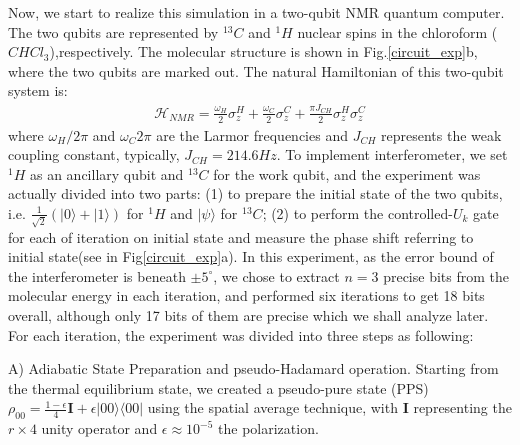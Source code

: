 \def\CTeXPreproc{Created by ctex v0.2.12, don't edit!}\documentclass[twocolumn,showpacs,twoside,10pt,superscriptaddress,prl]{revtex4}
\begin{document}
Now, we start to realize this simulation in a two-qubit NMR quantum
computer. The two qubits are represented by $^{13}C$ and $^{1}H$
nuclear spins in the chloroform ($CHCl_{3}$),respectively. The
molecular structure is shown in Fig.\ref{circuit_exp}b, where the
two qubits are marked out. The natural Hamiltonian of this two-qubit
system is:
\begin{eqnarray}\label{HamCHF}
\mathcal{H}_{\mathit{NMR}}=\frac{\omega_{H}}{2}\sigma_{z}^H+\frac{\omega_{C}}{2}\sigma_{z}^{C}+\frac{\pi
J_{CH}}{2}\sigma_{z}^{H}\sigma_{z}^{C}
\end{eqnarray}
where $\omega_{H}/2\pi$ and $\omega_{C}2\pi$ are the Larmor
frequencies and $J_{CH}$ represents the weak coupling constant,
typically, $J_{CH}=214.6Hz$. To implement interferometer, we set
$^{1}H$ as an ancillary qubit and $^{13}C$ for the work qubit, and
the experiment was actually divided into two parts: (1) to prepare
 the initial state of the two qubits, i.e.
$\frac{1}{\sqrt{2}}(|0\rangle+|1\rangle)$ for $^{1}H$ and
$|\psi\rangle$ for $^{13}C$; (2) to perform the controlled-$U_k$
gate for each of iteration on initial state and measure the phase
shift referring to initial state(see in Fig\ref{circuit_exp}a). In
this experiment, as the error bound of the interferometer is beneath
$\pm5^\circ$, we chose to extract $n=3$ precise bits from the
molecular energy in each iteration, and performed six iterations to
get 18 bits overall, although only 17 bits of them are precise which
we shall analyze later. For each iteration, the experiment was
divided into three steps as following:

A) Adiabatic State Preparation and pseudo-Hadamard operation.
  Starting from the thermal equilibrium state, we created a pseudo-pure state (PPS) $\rho_{00} =\frac{1 -
\epsilon}{4} \mathbf{I}+ \epsilon|00\rangle \langle 00|$ using the
spatial average technique\cite{spatial}, with $\mathbf{I}$
representing the $r \times 4$ unity operator and $\epsilon \approx
10^{-5}$  the polarization.
\end{document}
